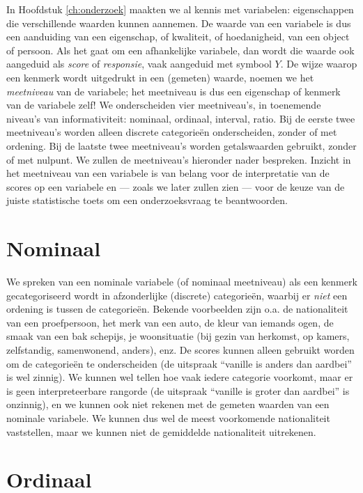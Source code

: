 \documentclass[
]{book}
\begin{document}
In Hoofdstuk \ref{ch:onderzoek} maakten we al kennis met variabelen:
eigenschappen die verschillende waarden kunnen aannemen. De waarde van
een variabele is dus een aanduiding van een eigenschap, of kwaliteit, of
hoedanigheid, van een object of persoon. Als het gaat om een
afhankelijke variabele, dan wordt die waarde ook aangeduid als \emph{score}
of \emph{responsie}, vaak aangeduid met symbool \(Y\). De wijze waarop een
kenmerk wordt uitgedrukt in een (gemeten) waarde, noemen we het
\emph{meetniveau} van de variabele; het meetniveau is dus een eigenschap of
kenmerk van de variabele zelf! We onderscheiden vier meetniveau's, in
toenemende niveau's van informativiteit: nominaal, ordinaal, interval,
ratio. Bij de eerste twee meetniveau's worden alleen discrete
categorieën onderscheiden, zonder of met ordening. Bij de laatste twee
meetniveau's worden getalswaarden gebruikt, zonder of met nulpunt. We
zullen de meetniveau's hieronder nader bespreken. Inzicht in het
meetniveau van een variabele is van belang voor de interpretatie van de
scores op een variabele en --- zoals we later zullen zien --- voor de
keuze van de juiste statistische toets om een onderzoeksvraag te
beantwoorden.

\hypertarget{sec:nominaal}{%
\section{Nominaal}\label{sec:nominaal}}

We spreken van een nominale variabele (of nominaal meetniveau) als een
kenmerk gecategoriseerd wordt in afzonderlijke (discrete) categorieën,
waarbij er \emph{niet} een ordening is tussen de categorieën. Bekende
voorbeelden zijn o.a. de nationaliteit van een proefpersoon, het merk
van een auto, de kleur van iemands ogen, de smaak van een bak schepijs,
je woonsituatie (bij gezin van herkomst, op kamers, zelfstandig,
samenwonend, anders), enz. De scores kunnen alleen gebruikt worden om de
categorieën te onderscheiden (de uitspraak ``vanille is anders dan
aardbei'' is wel zinnig). We kunnen wel tellen hoe vaak iedere categorie
voorkomt, maar er is geen interpreteerbare rangorde (de uitspraak ``vanille
is groter dan aardbei'' is onzinnig), en we kunnen ook niet rekenen met
de gemeten waarden van een nominale variabele. We kunnen dus wel de
meest voorkomende nationaliteit vaststellen, maar we kunnen niet de
gemiddelde nationaliteit uitrekenen.

\hypertarget{sec:ordinaal}{%
\section{Ordinaal}\label{sec:ordinaal}}
\end{document}
